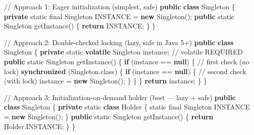 \documentclass[11pt]{article}
\newenvironment{Shaded}{\begin{snugshade}}{\end{snugshade}}
\newcommand{\BuiltInTok}[1]{\textcolor[rgb]{0.50,0.55,0.55}{#1}}
\newcommand{\CommentTok}[1]{\textcolor[rgb]{0.48,0.49,0.49}{#1}}
\newcommand{\ControlFlowTok}[1]{\textcolor[rgb]{0.99,0.74,0.29}{\textbf{#1}}}
\newcommand{\DataTypeTok}[1]{\textcolor[rgb]{0.16,0.50,0.73}{#1}}
\newcommand{\FunctionTok}[1]{\textcolor[rgb]{0.56,0.27,0.68}{#1}}
\newcommand{\KeywordTok}[1]{\textcolor[rgb]{0.81,0.81,0.76}{\textbf{#1}}}
\newcommand{\NormalTok}[1]{\textcolor[rgb]{0.81,0.81,0.76}{#1}}
\newcommand{\OperatorTok}[1]{\textcolor[rgb]{0.81,0.81,0.76}{#1}}
\begin{document}
\begin{Shaded}
\begin{Highlighting}[]
\CommentTok{// Approach 1: Eager initialization (simplest, safe)}
\KeywordTok{public} \KeywordTok{class}\NormalTok{ Singleton }\OperatorTok{\{}
    \KeywordTok{private} \DataTypeTok{static} \DataTypeTok{final}\NormalTok{ Singleton INSTANCE }\OperatorTok{=} \KeywordTok{new} \FunctionTok{Singleton}\OperatorTok{();}
    \KeywordTok{public} \DataTypeTok{static}\NormalTok{ Singleton }\FunctionTok{getInstance}\OperatorTok{()} \OperatorTok{\{} \ControlFlowTok{return}\NormalTok{ INSTANCE}\OperatorTok{;} \OperatorTok{\}}
\OperatorTok{\}}

\CommentTok{// Approach 2: Double{-}checked locking (lazy, safe in Java 5+)}
\KeywordTok{public} \KeywordTok{class}\NormalTok{ Singleton }\OperatorTok{\{}
    \KeywordTok{private} \DataTypeTok{static} \KeywordTok{volatile}\NormalTok{ Singleton instance}\OperatorTok{;}  \CommentTok{// volatile REQUIRED}
    \KeywordTok{public} \DataTypeTok{static}\NormalTok{ Singleton }\FunctionTok{getInstance}\OperatorTok{()} \OperatorTok{\{}
        \ControlFlowTok{if} \OperatorTok{(}\NormalTok{instance }\OperatorTok{==} \KeywordTok{null}\OperatorTok{)} \OperatorTok{\{}                  \CommentTok{// first check (no lock)}
            \KeywordTok{synchronized} \OperatorTok{(}\NormalTok{Singleton}\OperatorTok{.}\FunctionTok{class}\OperatorTok{)} \OperatorTok{\{}
                \ControlFlowTok{if} \OperatorTok{(}\NormalTok{instance }\OperatorTok{==} \KeywordTok{null}\OperatorTok{)} \OperatorTok{\{}          \CommentTok{// second check (with lock)}
\NormalTok{                    instance }\OperatorTok{=} \KeywordTok{new} \FunctionTok{Singleton}\OperatorTok{();}
                \OperatorTok{\}}
            \OperatorTok{\}}
        \OperatorTok{\}}
        \ControlFlowTok{return}\NormalTok{ instance}\OperatorTok{;}
    \OperatorTok{\}}
\OperatorTok{\}}

\CommentTok{// Approach 3: Initialization{-}on{-}demand holder (best — lazy + safe)}
\KeywordTok{public} \KeywordTok{class}\NormalTok{ Singleton }\OperatorTok{\{}
    \KeywordTok{private} \DataTypeTok{static} \KeywordTok{class} \BuiltInTok{Holder} \OperatorTok{\{}
        \DataTypeTok{static} \DataTypeTok{final}\NormalTok{ Singleton INSTANCE }\OperatorTok{=} \KeywordTok{new} \FunctionTok{Singleton}\OperatorTok{();}
    \OperatorTok{\}}
    \KeywordTok{public} \DataTypeTok{static}\NormalTok{ Singleton }\FunctionTok{getInstance}\OperatorTok{()} \OperatorTok{\{} \ControlFlowTok{return} \BuiltInTok{Holder}\OperatorTok{.}\FunctionTok{INSTANCE}\OperatorTok{;} \OperatorTok{\}}
\OperatorTok{\}}
\end{Highlighting}
\end{Shaded}
\end{document}
